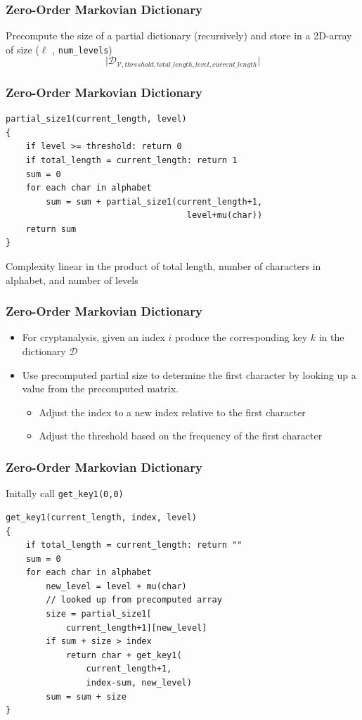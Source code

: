 \documentclass{beamer}
\begin{document}
\begin{frame}
\frametitle{Zero-Order Markovian Dictionary}
Precompute the size of a partial dictionary (recursively) and store in a 2D-array of size ($\ell$ , \texttt{num\_levels}) \\
\begin{equation*}
\lvert \mathcal{D}_{\mathcal{V},threshold, total\_length, level, current\_length} \rvert
\end{equation*}
\end{frame}

\begin{frame}[fragile]
\frametitle{Zero-Order Markovian Dictionary}
\begin{verbatim}
partial_size1(current_length, level)
{
    if level >= threshold: return 0
    if total_length = current_length: return 1
    sum = 0
    for each char in alphabet
        sum = sum + partial_size1(current_length+1, 
                                    level+mu(char))
    return sum
}
\end{verbatim}
Complexity linear in the product of total length, number of characters in alphabet, and number of levels
\end{frame}

\begin{frame}
\frametitle{Zero-Order Markovian Dictionary}
\begin{itemize}
\item For cryptanalysis, given an index $i$ produce the corresponding key $k$ in the dictionary $\mathcal{D}$
\item Use precomputed partial size to determine the first character by looking up a value from the precomputed matrix.
\begin{itemize}
\item Adjust the index to a new index relative to the first character
\item Adjust the threshold based on the frequency of the first character
\end{itemize}
\end{itemize}

\end{frame}

\begin{frame}[fragile]
\frametitle{Zero-Order Markovian Dictionary}
Initally call \texttt{get\_key1(0,0)}
\begin{verbatim}
get_key1(current_length, index, level)
{
    if total_length = current_length: return ""
    sum = 0
    for each char in alphabet
        new_level = level + mu(char)
        // looked up from precomputed array
        size = partial_size1[
            current_length+1][new_level]
        if sum + size > index
            return char + get_key1(
                current_length+1,
                index-sum, new_level)
        sum = sum + size
}
\end{verbatim}
\end{frame}
\end{document}
